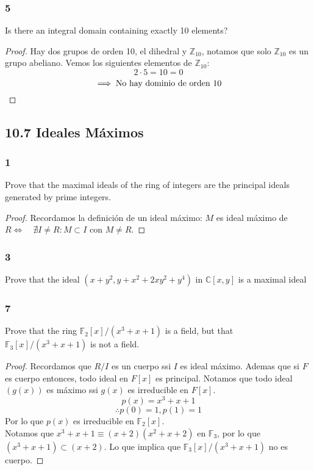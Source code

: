 \documentclass[11pt]{article}
\newcommand{\set}[1]{\mathbb{#1}}
\theoremstyle{definition}
\begin{document}
        \subsubsection{5}
        Is there an integral domain containing exactly 10 elements?
        \begin{proof}
            Hay dos grupos de orden 10, el dihedral y $\set{Z}_{10}$, notamos que solo $\set{Z}_{10}$ es un grupo abeliano. Vemos los siguientes elementos de $\set{Z}_{10}$:
            \[2\cdot 5=10=0\]
            \[\implies \textrm{No hay dominio de orden 10}\qedhere\]
        \end{proof}

        \subsection{10.7 Ideales Máximos}
        \subsubsection{1}
        Prove that the maximal ideals of the ring of integers are the principal ideals generated by prime integers.
        \begin{proof}
            Recordamos la definición de un ideal máximo: $M$ es ideal máximo de $R\iff\quad \nexists I\neq R:M\subset I$ con $M\neq R$.
        \end{proof}

        \subsubsection{3}
        Prove that the ideal $(x+y^2,y+x^2+2xy^2+y^4)$ in $\set{C}[x,y]$ is a maximal ideal

        \subsubsection{7}
        Prove that the ring $\set{F}_2[x]/(x^3+x+1)$ is a field, but that $\set{F}_3[x]/(x^3+x+1)$ is not a field.
        \begin{proof}
            Recordamos que $R/I$ es un cuerpo ssi $I$ es ideal máximo. Ademas que si $F$ es cuerpo entonces, todo ideal en $F[x]$ es principal. Notamos que todo ideal $(g(x))$ es máximo ssi $g(x)$ es irreducible en $F[x]$.
            \[p(x)=x^3+x+1\]
            \[\therefore p(0)=1,p(1)=1\]
            Por lo que $p(x)$ es irreducible en $\set{F}_2[x]$.\\
            Notamos que $x^3+x+1\equiv (x+2)(x^2+x+2)$ en $\set{F}_3$, por lo que $(x^3+x+1)\subset(x+2)$. Lo que implica que $\set{F}_3[x]/(x^3+x+1)$ no es cuerpo.
        \end{proof}
\end{document}
